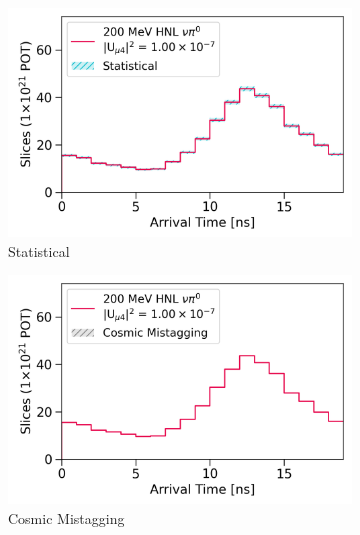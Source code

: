 \begin{figure}[htbp!]
        \begin{subfigure}[b]{0.495\textwidth}   
            \centering 
            \includegraphics[width=\textwidth]{hnl_statistics_error}
            \caption{Statistical}%
            \label{fig:hnl_stat}
        \end{subfigure}
        \hfill
        \begin{subfigure}[b]{0.495\textwidth}   
            \centering 
            \includegraphics[width=\textwidth]{hnl_mistagging_error}
            \caption{Cosmic Mistagging}%
            \label{fig:hnl_mistag}
        \end{subfigure}
        \centering
        \begin{subfigure}[b]{0.495\textwidth}   
            \centering 

\end{subfigure}
\end{figure}
